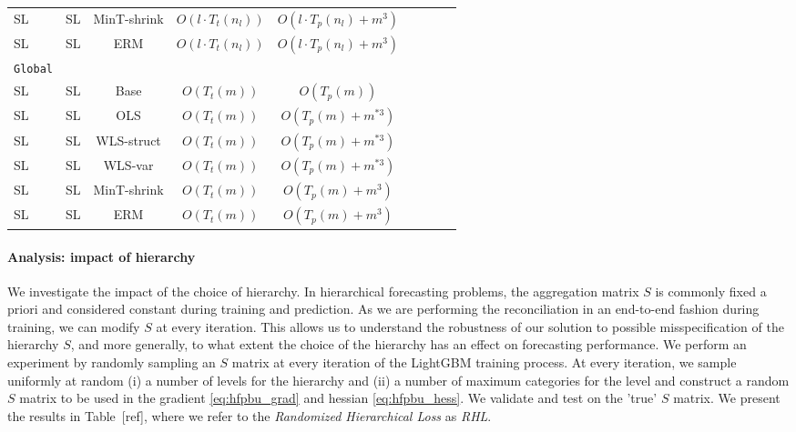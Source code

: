 \documentclass[preprint, 3p, times, twocolumn]{elsarticle}
\begin{document}
\begin{table*}[t]
\begin{center}
{\begin{tabular}{l c ccccccc}
    \hspace{0.1cm} 	SL	&SL	&MinT-shrink & $O(l \cdot T_t(n_l))$	&$O(l \cdot T_p(n_l) + m^3)$	\\
    \hspace{0.1cm} 	SL	&SL	&ERM & $O(l \cdot T_t(n_l))$	&$O(l \cdot T_p(n_l) + m^3)$ \\
    \midrule																	
    \texttt{Global}																	\\
    \hspace{0.1cm} 	SL	&SL	&Base & $O(T_t(m))$	&$O(T_p(m))$		\\
    \hspace{0.1cm} 	SL	&SL	&OLS	& $O(T_t(m))$	&$O(T_p(m) + m^{*3})$		\\
    \hspace{0.1cm} 	SL	&SL	&WLS-struct	& $O(T_t(m))$	&$O(T_p(m) + m^{*3})$	\\
    \hspace{0.1cm} 	SL	&SL	&WLS-var	& $O(T_t(m))$	&$O(T_p(m) + m^{*3})$	\\
    \hspace{0.1cm} 	SL	&SL	&MinT-shrink & $O(T_t(m))$	&$O(T_p(m) + m^3)$	\\
    \hspace{0.1cm} 	SL	&SL	&ERM & $O(T_t(m))$	&$O(T_p(m) + m^3)$ \\
    \bottomrule
    \end{tabular}}
    \end{center}
    \end{table*}

  \paragraph{Analysis: impact of hierarchy} We investigate the impact of the choice of hierarchy. In hierarchical forecasting problems, the aggregation matrix \(S\) is commonly fixed a priori and considered constant during training and prediction. As we are performing the reconciliation in an end-to-end fashion during training, we can modify \(S\) at every iteration. This allows us to understand the robustness of our solution to possible misspecification of the hierarchy \(S\), and more generally, to what extent the choice of the hierarchy has an effect on forecasting performance. We perform an experiment by randomly sampling an \(S\) matrix at every iteration of the LightGBM training process. At every iteration, we sample uniformly at random (i) a number of levels for the hierarchy and (ii) a number of maximum categories for the level and construct a random \(S\) matrix to be used in the gradient \eqref{eq:hfpbu_grad} and hessian \eqref{eq:hfpbu_hess}. We validate and test on the 'true' \(S\) matrix. We present the results in Table~[ref], where we refer to the \textit{Randomized Hierarchical Loss} as \textit{RHL}.
\end{document}
